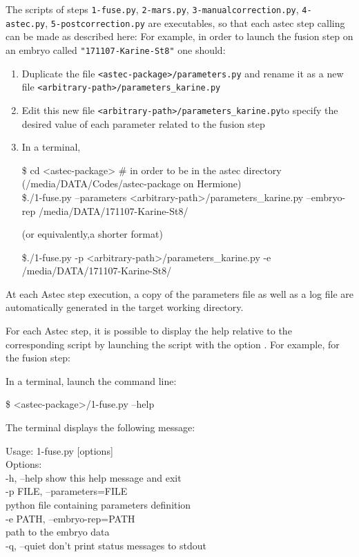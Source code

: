 The scripts of steps \texttt{1-fuse.py}, \texttt{2-mars.py}, \texttt{3-manualcorrection.py}, \texttt{4-astec.py}, \texttt{5-postcorrection.py} are executables, so that each astec step calling can be made as described here:
For example, in order to launch the fusion step on an embryo called \texttt{"171107-Karine-St8"} one should:
\begin{enumerate}
\item Duplicate the file \texttt{<astec-package>/parameters.py} and rename it as a new file \texttt{<arbitrary-path>/parameters\_karine.py}
\item Edit this new  file \texttt{<arbitrary-path>/parameters\_karine.py}to specify the desired value of each parameter related to the fusion step
\item In a terminal,
\begin{code}{0.8}
\$ cd <astec-package> \# in order to be in the astec directory (/media/DATA/Codes/astec-package on Hermione) \\
\$./1-fuse.py --parameters  <arbitrary-path>/parameters\_karine.py --embryo-rep /media/DATA/171107-Karine-St8/
\end{code}
 (or equivalently,a shorter format)
 \begin{code}{0.8}
\$./1-fuse.py -p  <arbitrary-path>/parameters\_karine.py -e /media/DATA/171107-Karine-St8/
\end{code}
\end{enumerate}


At each Astec step execution, a copy of the parameters file as well as a log file are automatically generated in the target working directory.

For each Astec step, it is possible to display the help relative to the corresponding script by launching the script with the option . For example, for the fusion step:

    In a terminal, launch the command line:
\begin{code}{0.8}
\$ <astec-package>/1-fuse.py --help
\end{code}
    The terminal displays the following message:
    
\begin{code}{0.8}
    Usage: 1-fuse.py [options] \\
    Options:\\
      -h, --help            show this help message and exit\\
      -p FILE, --parameters=FILE\\
                                python file containing parameters definition\\
      -e PATH, --embryo-rep=PATH\\
                                path to the embryo data\\
      -q, --quiet          don't print status messages to stdout\\
\end{code}



